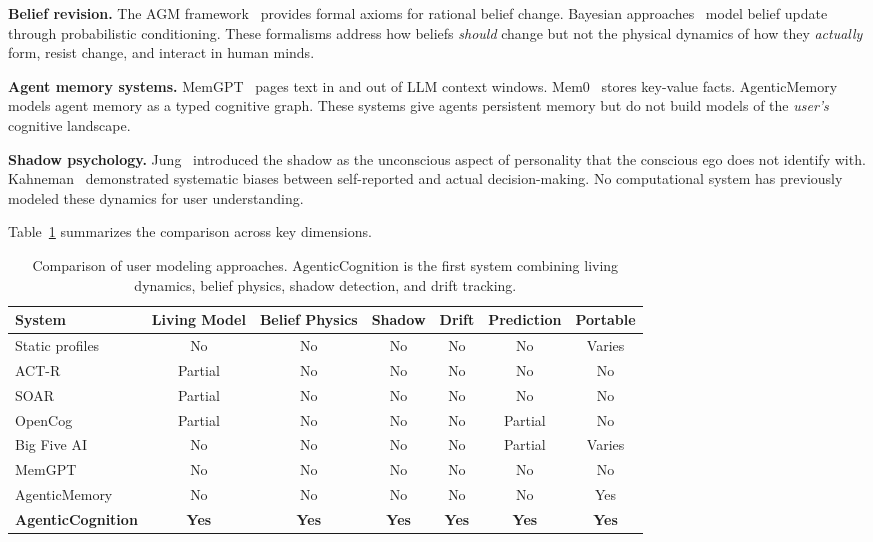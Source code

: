 \documentclass[10pt, twocolumn]{article}
\begin{document}
\textbf{Belief revision.} The AGM framework~\cite{alchourron1985logic} provides formal axioms for rational belief change. Bayesian approaches~\cite{pearl2009causality} model belief update through probabilistic conditioning. These formalisms address how beliefs \emph{should} change but not the physical dynamics of how they \emph{actually} form, resist change, and interact in human minds.

\textbf{Agent memory systems.} MemGPT~\cite{packer2023memgpt} pages text in and out of LLM context windows. Mem0~\cite{mem0_2024} stores key-value facts. AgenticMemory~\cite{agenticmemory} models agent memory as a typed cognitive graph. These systems give agents persistent memory but do not build models of the \emph{user's} cognitive landscape.

\textbf{Shadow psychology.} Jung~\cite{jung1959archetypes} introduced the shadow as the unconscious aspect of personality that the conscious ego does not identify with. Kahneman~\cite{kahneman2003perspective} demonstrated systematic biases between self-reported and actual decision-making. No computational system has previously modeled these dynamics for user understanding.

Table~\ref{tab:related} summarizes the comparison across key dimensions.

\begin{table}[t]
\caption{Comparison of user modeling approaches. AgenticCognition is the first system combining living dynamics, belief physics, shadow detection, and drift tracking.}
\label{tab:related}
\centering
\small
\begin{tabular}{@{}lcccccc@{}}
\toprule
\textbf{System} & \textbf{Living Model} & \textbf{Belief Physics} & \textbf{Shadow} & \textbf{Drift} & \textbf{Prediction} & \textbf{Portable} \\
\midrule
Static profiles~\cite{brusilovsky2001adaptive} & No & No & No & No & No & Varies \\
ACT-R~\cite{anderson2004integrated} & Partial & No & No & No & No & No \\
SOAR~\cite{laird2012soar} & Partial & No & No & No & No & No \\
OpenCog~\cite{goertzel2014opencog} & Partial & No & No & No & Partial & No \\
Big Five AI~\cite{mairesse2007personage} & No & No & No & No & Partial & Varies \\
MemGPT~\cite{packer2023memgpt} & No & No & No & No & No & No \\
AgenticMemory~\cite{agenticmemory} & No & No & No & No & No & Yes \\
\midrule
\textbf{AgenticCognition} & \textbf{Yes} & \textbf{Yes} & \textbf{Yes} & \textbf{Yes} & \textbf{Yes} & \textbf{Yes} \\
\bottomrule
\end{tabular}
\end{table}
\end{document}
